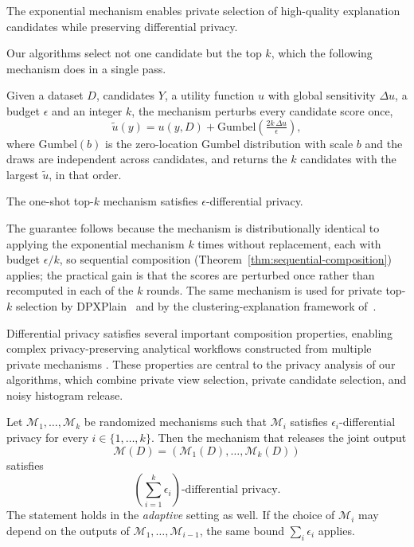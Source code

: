 The exponential mechanism enables private selection of high-quality explanation
candidates while preserving differential privacy.

Our algorithms select not one candidate but the top $k$, which the following mechanism does in a single pass.

\begin{definition}
\label{def:oneshot-topk}
Given a dataset $D$, candidates $Y$, a utility function $u$ with global sensitivity $\Delta u$, a budget $\epsilon$ and an integer $k$, the mechanism perturbs every candidate score once,
\[
\tilde{u}(y)=u(y,D)+\mathrm{Gumbel}\!\left(\tfrac{2k\,\Delta u}{\epsilon}\right),
\]
where $\mathrm{Gumbel}(b)$ is the zero-location Gumbel distribution with scale $b$
and the draws are independent across candidates,
and returns the $k$ candidates with the largest $\tilde{u}$, in that order.
\end{definition}

\begin{theorem}
\label{thm:oneshot-topk}
The one-shot top-$k$ mechanism satisfies $\epsilon$-differential privacy.
\end{theorem}

The guarantee follows because the mechanism is distributionally identical to applying the exponential mechanism $k$ times without replacement, each with budget $\epsilon/k$, so sequential composition (Theorem~\ref{thm:sequential-composition}) applies; the practical gain is that the scores are perturbed once rather than recomputed in each of the $k$ rounds.
The same mechanism is used for private top-$k$ selection by DPXPlain~\cite{TaoGMR22} and by the clustering-explanation framework of~\cite{DPClustX}.


Differential privacy satisfies several important composition properties, enabling
complex privacy-preserving analytical workflows constructed from multiple private
mechanisms \cite{mcsherry2009,DBLP:series/synthesis/2016Li,bun2016}.
These properties are central to the privacy analysis of our algorithms, which combine
private view selection, private candidate selection, and noisy histogram release.

\begin{theorem}
\label{thm:sequential-composition}
Let $\mathcal{M}_1,\ldots,\mathcal{M}_k$ be randomized mechanisms such that
$\mathcal{M}_i$ satisfies $\epsilon_i$-differential privacy for every
$i \in \{1,\ldots,k\}$.
Then the mechanism that releases the joint output
\[
\mathcal{M}(D)
=
\left(
\mathcal{M}_1(D),
\ldots,
\mathcal{M}_k(D)
\right)
\]
satisfies
\[
\left(\sum_{i=1}^{k}\epsilon_i\right)
\text{-differential privacy}.
\]
The statement holds in the \emph{adaptive} setting as well.
If the choice of $\mathcal{M}_i$ may depend on the outputs of $\mathcal{M}_1,\dots,\mathcal{M}_{i-1}$, the same bound $\sum_i\epsilon_i$ applies.
\end{theorem}


